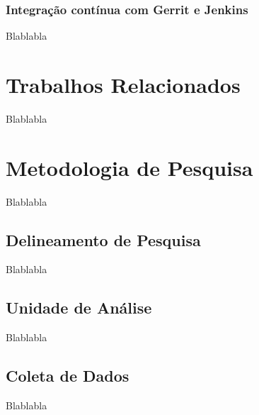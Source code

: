 \documentclass[11.5pt]{article}
\begin{document}
\subsubsection{Integração contínua com Gerrit e Jenkins}
Blablabla




\section{Trabalhos Relacionados}
Blablabla




\section{Metodologia de Pesquisa}
Blablabla


\subsection{Delineamento de Pesquisa}
Blablabla


\subsection{Unidade de Análise}
Blablabla


\subsection{Coleta de Dados}
Blablabla
\end{document}
